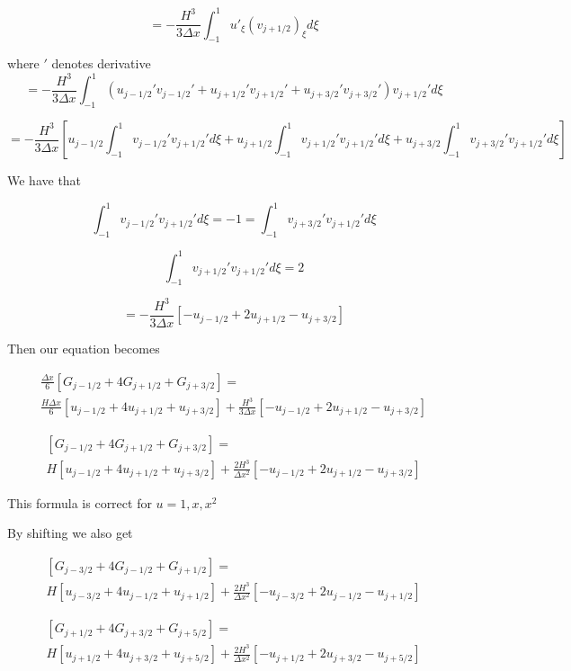 \documentclass[12pt]{article}
\begin{document}
\[= -\frac{H^3}{3\Delta x}\int_{-1}^{1}u'_{\xi}(v_{j+ 1/2})_{\xi} d\xi   \]

where $'$ denotes derivative
\[= -\frac{H^3}{3\Delta x}\int_{-1}^{1}\left(u_{j- 1/2}'v_{j - 1/2}' + u_{j+ 1/2}'v_{j+ 1/2}' +u_{j+ 3/2}'v_{j+ 3/2}' \right)v_{j+ 1/2}' d\xi   \]

\[= -\frac{H^3}{3\Delta x}\left[u_{j- 1/2} \int_{-1}^{1} v_{j - 1/2}'v_{j + 1/2}' d\xi + u_{j+ 1/2} \int_{-1}^{1} v_{j + 1/2}'v_{j + 1/2}' d\xi +  u_{j+3/2} \int_{-1}^{1} v_{j + 3/2}'v_{j + 1/2}' d\xi\right]   \]

We have that 

\[\int_{-1}^{1} v_{j - 1/2}'v_{j + 1/2}' d\xi = -1 = \int_{-1}^{1} v_{j + 3/2}'v_{j + 1/2}' d\xi \]

\[\int_{-1}^{1} v_{j + 1/2}'v_{j + 1/2}' d\xi = 2\]

\[= -\frac{H^3}{3\Delta x}\left[-u_{j- 1/2}  + 2u_{j+ 1/2} -  u_{j+3/2} \right]   \]

Then our equation becomes

\begin{multline}
\frac{\Delta x}{6} \left[G_{j- 1/2} + 4G_{j+ 1/2} +  G_{j+3/2} \right] = \\ \frac{H\Delta x}{6} \left[u_{j- 1/2} + 4u_{j+ 1/2} +  u_{j+3/2} \right] +  \frac{H^3}{3\Delta x}\left[-u_{j- 1/2}  + 2u_{j+ 1/2} -  u_{j+3/2} \right]
\end{multline}

\begin{multline}
\left[G_{j- 1/2} + 4G_{j+ 1/2} +  G_{j+3/2} \right] = \\ H \left[u_{j- 1/2} + 4u_{j+ 1/2} +  u_{j+3/2} \right] +  \frac{2H^3}{\Delta x^2}\left[-u_{j- 1/2}  + 2u_{j+ 1/2} -  u_{j+3/2} \right]
\end{multline}

This formula is correct for $u= 1,x,x^2$

By shifting we also get

\begin{multline}
\left[G_{j- 3/2} + 4G_{j-1/2} +  G_{j+1/2} \right] = \\ H \left[u_{j- 3/2} + 4u_{j- 1/2} +  u_{j+1/2} \right] +  \frac{2H^3}{\Delta x^2}\left[-u_{j- 3/2}  + 2u_{j- 1/2} -  u_{j+1/2} \right]
\end{multline}

\begin{multline}
\left[G_{j+ 1/2} + 4G_{j+ 3/2} +  G_{j+5/2} \right] = \\ H \left[u_{j+1/2} + 4u_{j+ 3/2} +  u_{j+5/2} \right] +  \frac{2H^3}{\Delta x^2}\left[-u_{j+ 1/2}  + 2u_{j+ 3/2} -  u_{j+5/2} \right]
\end{multline}
\end{document}
